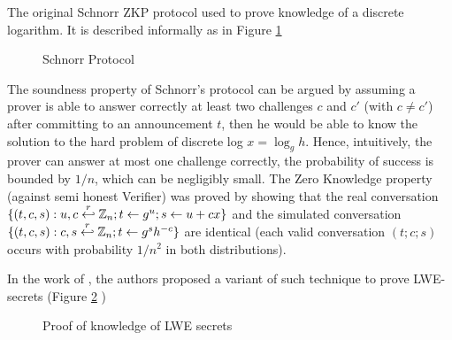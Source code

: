 The original Schnorr ZKP protocol \cite{schnorr1989efficient} used to prove knowledge of a discrete logarithm. It is described informally as in Figure \ref{fig:schnorrProtocol}

\begin{figure}[htbp!] 
\centering {}
\caption{Schnorr Protocol}
\label{fig:schnorrProtocol}
\end{figure}

The soundness property of Schnorr's protocol can be argued by assuming a prover
is able to answer correctly at least two challenges $c$ and $c'$ (with
$c \neq c'$) after committing to an announcement $t$, then he would be able to know
the solution to the hard problem of discrete log $x = \log_{g}h$. Hence,
intuitively, the prover can answer at most one challenge correctly, the
probability of success is bounded by $1/n$, which can be negligibly small. The
Zero Knowledge property (against semi honest Verifier) was proved by showing
that the real conversation
$\{(t,c,s): u,c \stackrel{r}{\hookleftarrow} \mathbb{Z}_{n}; t \gets g^{u}; s \gets u + cx\}$
and the simulated conversation
$\{(t,c,s): c, s \stackrel{r}{\hookleftarrow} \mathbb{Z}_{n}; t \gets g^{s}h^{-c}\}$ are
identical (each valid conversation $(t;c;s)$ occurs with probability $1/n^{2}$
in both distributions).

In the work of \cite{benhamouda2014better}, the authors proposed a variant of
such technique to prove LWE-secrets (Figure \ref{fig:benhamoudaProtocol} )
\begin{figure}[htbp!] 
\centering {}
\caption{Proof of knowledge of LWE secrets}
\label{fig:benhamoudaProtocol}
\end{figure}

